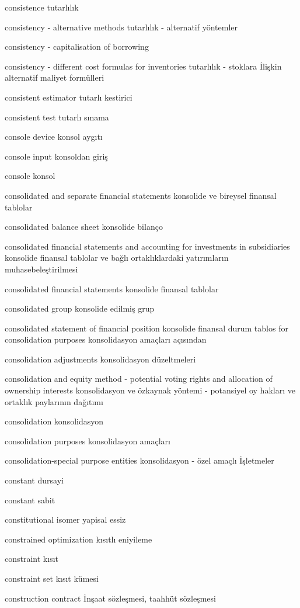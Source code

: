 \documentclass[12pt,fleqn]{article}\usepackage{../../common}
\begin{document}
consistence tutarlılık

consistency - alternative methods tutarlılık - alternatif yöntemler

consistency - capitalisation of borrowing

consistency - different cost formulas for inventories tutarlılık - stoklara İlişkin alternatif maliyet formülleri

consistent estimator tutarlı kestirici

consistent test tutarlı sınama

console device konsol aygıtı

console input konsoldan giriş

console konsol

consolidated and separate financial statements konsolide ve bireysel finansal tablolar

consolidated balance sheet konsolide bilanço

consolidated financial statements and accounting for investments in subsidiaries konsolide finansal tablolar ve bağlı ortaklıklardaki yatırımların muhasebeleştirilmesi

consolidated financial statements konsolide finansal tablolar

consolidated group konsolide edilmiş grup

consolidated statement of financial position konsolide finansal durum tablos for consolidation purposes konsolidasyon amaçları açısından

consolidation adjustments konsolidasyon düzeltmeleri

consolidation and equity method - potential voting rights and allocation of ownership interests konsolidasyon ve özkaynak yöntemi - potansiyel oy hakları ve ortaklık paylarının dağıtımı

consolidation konsolidasyon

consolidation purposes konsolidasyon amaçları

consolidation-special purpose entities konsolidasyon - özel amaçlı İşletmeler

constant dursayi

constant sabit

constitutional isomer yapisal essiz

constrained optimization kısıtlı eniyileme

constraint kısıt

constraint set kısıt kümesi

construction contract İnşaat sözleşmesi, taahhüt sözleşmesi
\end{document}
